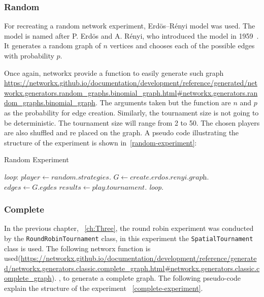 \subsubsection{Random}
For recreating a random network experiment, Erd\"{o}s–R\'{e}nyi model was used.
The model is named after P. Erd\"{o}s and A. R\'{e}nyi, who introduced
the model in 1959~\cite{Erdos1959}. It generates a random graph of \(n\)
vertices and chooses each of the possible edges with probability \(p\).

Once again, networkx provide a function to easily generate such graph
\url{https://networkx.github.io/documentation/development/reference/generated/networkx.generators.random_graphs.binomial_graph.html#networkx.generators.random_graphs.binomial_graph}.
The arguments taken but the function are \(n\)  and \(p\) as the probability for
edge creation. Similarly, the tournament size is not going to be deterministic.
The tournament size will range from 2 to 50. The chosen players are also shuffled
and re placed on the graph. A pseudo code illustrating the structure of the
experiment is shown in~\ref{random-experiment}:

\begin{algorithm}
	\caption{Random Experiment}\label{random-experiment}
	\begin{algorithmic}
		\BState \emph{loop}:
		\State $player \gets \textit{random.strategies}$.
		\State $G \gets \textit{create.erdos.renyi.graph}$.
		\State $edges \gets \textit{G.egdes}$
		\State $results \gets \textit{play.tournament}$.
		\emph{loop}.
		\EndFor
		\EndFor
		\EndFor
		\EndProcedure
	\end{algorithmic}
\end{algorithm}

\subsubsection{Complete}

In the previous chapter, ~\ref{ch:Three}, the round robin experiment was
conducted by the \texttt{RoundRobinTournament} class, in this experiment the
\texttt{SpatialTournament} class is used.
The following networx function is used(\url{https://networkx.github.io/documentation/development/reference/generated/networkx.generators.classic.complete_graph.html#networkx.generators.classic.complete_graph}).
, to generate a complete graph. The following pseudo-code explain the structure
of the experiment ~\ref{complete-experiment}.

